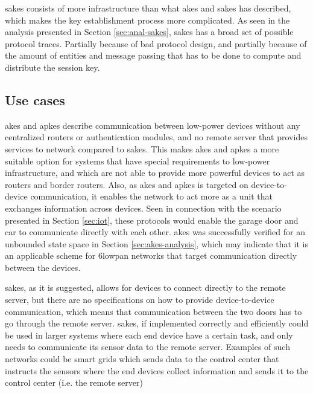 \gls{sakes} consists of more infrastructure than what \gls{akes} and \gls{sakes} has described, which makes the key establishment process more complicated. As seen in the analysis presented in Section \ref{sec:anal-sakes}, \gls{sakes} has a broad set of possible protocol traces. Partially because of bad protocol design, and partially because of the amount of entities and message passing that has to be done to compute and distribute the session key.


\subsection{Use cases}


\gls{akes} and \gls{apkes} describe communication between low-power devices without any centralized routers or authentication modules, and no remote server that provides services to network compared to \gls{sakes}. This makes \gls{akes} and \gls{apkes} a more suitable option for systems that have special requirements to low-power infrastructure, and which are not able to provide more powerful devices to act as routers and border routers. Also, as \gls{akes} and \gls{apkes} is targeted on device-to-device communication, it enables the network to act more as a unit that exchanges information across devices. Seen in connection with the scenario presented in Section \ref{sec:iot}, these protocols would enable the garage door and car to communicate directly with each other. \gls{akes} was successfully verified for an unbounded state space in Section \ref{sec:akes-analysis}, which may indicate that it is an applicable scheme for \gls{6lowpan} networks that target communication directly between the devices.

\gls{sakes}, as it is suggested, allows for devices to connect directly to the remote server, but there are no specifications on how to provide device-to-device communication, which means that communication between the two doors has to go through the remote server. \gls{sakes}, if implemented correctly and efficiently could be used in larger systems where each end device have a certain task, and only needs to communicate its sensor data to the remote server. Examples of such networks could be smart grids which sends data to the control center that instructs the sensors where the end devices collect information and sends it to the control center (i.e. the remote server)



